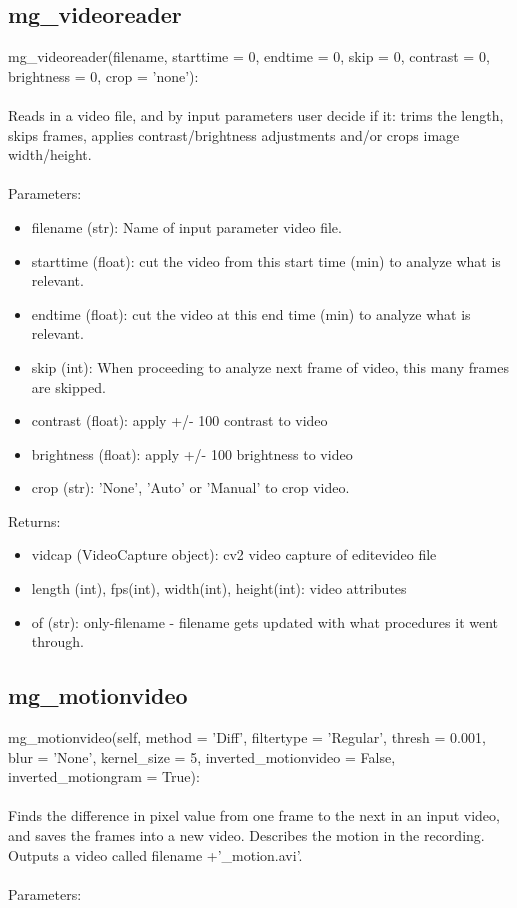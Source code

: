 \documentclass[9pt]{extarticle}
\begin{document}
\subsection{mg\_videoreader}
    mg\_videoreader(filename, starttime = 0, endtime = 0, skip = 0, contrast = 0, brightness = 0, crop = 'none'):
    \\\\
    Reads in a video file, and by input parameters user decide if it: trims the length, skips frames, applies contrast/brightness adjustments and/or crops image width/height.
    \\\\
    Parameters:
    \begin{itemize}
     \item [] filename (str): Name of input parameter video file.
     \item [] starttime (float): cut the video from this start time (min) to analyze what is relevant.
     \item [] endtime (float): cut the video at this end time (min) to analyze what is relevant.
     \item [] skip (int): When proceeding to analyze next frame of video, this many frames are skipped.
     \item [] contrast (float): apply +/- 100 contrast to video
     \item [] brightness (float): apply +/- 100 brightness to video
     \item [] crop (str): 'None', 'Auto' or 'Manual' to crop video.
    \end{itemize}
    Returns:
    \begin{itemize}
    \item [] vidcap (VideoCapture object): cv2 video capture of editevideo file
    \item [] length (int), fps(int), width(int), height(int): video attributes
     \item [] of (str): only-filename - filename gets updated with what procedures it went through.
 \end{itemize}

\subsection{mg\_motionvideo}    
    mg\_motionvideo(self, method = 'Diff', filtertype = 'Regular', thresh = 0.001, blur = 'None', kernel\_size = 5, inverted\_motionvideo = False, inverted\_motiongram = True):
    \\\\
    Finds the difference in pixel value from one frame to the next in an input video, and saves the frames into a new video.
    Describes the motion in the recording.    
    Outputs a video called filename +'\_motion.avi'.
    \\\\
    Parameters:
    
\end{document}
